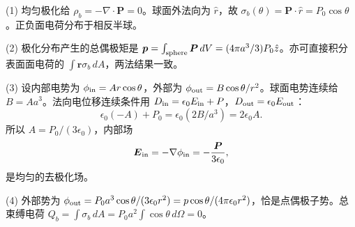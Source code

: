(1) 均匀极化给 \(\rho_b=-\nabla\cdot\boldsymbol P=0\)。球面外法向为 \(\hat r\)，故 \(\sigma_b(\theta)=\boldsymbol P\cdot\hat r=P_0\cos\theta\)。正负面电荷分布于相反半球。

(2) 极化分布产生的总偶极矩是 \(\boldsymbol p=\int_{\rm sphere}\boldsymbol P\,dV=(4\pi a^3/3)P_0\hat z\)。亦可直接积分表面面电荷的 \(\int\boldsymbol r\sigma_b\,dA\)，两法结果一致。

(3) 设内部电势为 \(\phi_{\rm in}=Ar\cos\theta\)，外部为 \(\phi_{\rm out}=B\cos\theta/r^2\)。球面电势连续给 \(B=Aa^3\)。法向电位移连续条件用 \(D_{\rm in}=\epsilon_0E_{\rm in}+P\)，\(D_{\rm out}=\epsilon_0E_{\rm out}\)：
\[
\epsilon_0(-A)+P_0=\epsilon_0(2B/a^3)=2\epsilon_0A.
\]
所以 \(A=P_0/(3\epsilon_0)\)，内部场
\[
\boldsymbol E_{\rm in}=-\nabla\phi_{\rm in}
=-\frac{\boldsymbol P}{3\epsilon_0},
\]
是均匀的去极化场。

(4) 外部势为 \(\phi_{\rm out}=P_0a^3\cos\theta/(3\epsilon_0r^2)=p\cos\theta/(4\pi\epsilon_0r^2)\)，恰是点偶极子势。总束缚电荷 \(Q_b=\int\sigma_b\,dA=P_0a^2\int\cos\theta\,d\Omega=0\)。
